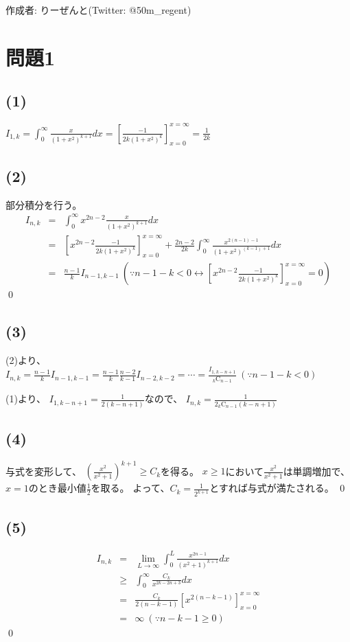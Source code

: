 \documentclass[]{jsarticle}
\begin{document}
作成者: りーぜんと(Twitter: @50m\_regent)
\section*{問題1}
    \subsection*{(1)}
        $
            \displaystyle I_{1, k} = \int^\infty_0\frac{x}{(1+x^2)^{k+1}}dx = \left[\frac{-1}{2k(1+x^2)^k}\right]^{x=\infty}_{x=0} = \frac{1}{2k}
        $
    \subsection*{(2)}
        部分積分を行う。
        \begin{eqnarray}
            I_{n, k} &=& \int^\infty_0x^{2n - 2}\frac{x}{(1 + x^2)^{k + 1}}dx \nonumber \\
            &=& \left[x^{2n - 2}\frac{-1}{2k(1 + x ^ 2)^k}\right]^{x=\infty}_{x=0} + \frac{2n-2}{2k}\int^\infty_0\frac{x^{2(n - 1) - 1}}{(1 + x^2)^{(k - 1) + 1}}dx \nonumber \\
            &=& \frac{n - 1}{k}I_{n - 1, k - 1} \ \left(\because n - 1 - k < 0 \leftrightarrow \left[x^{2n - 2}\frac{-1}{2k(1 + x ^ 2)^k}\right]^{x=\infty}_{x=0} = 0 \right) \nonumber
        \end{eqnarray}
        \qed
    \subsection*{(3)}
        (2)より、
        $\displaystyle I_{n, k} = \frac{n - 1}{k}I_{n - 1, k - 1} = \frac{n - 1}{k}\frac{n - 2}{k - 1}I_{n - 2, k - 2} = \cdots = \frac{I_{1, {k - n + 1}}}{{}_k\mathrm C_{n - 1}} \ (\because n - 1 - k < 0)$

        (1)より、
        $\displaystyle I_{1, {k - n + 1}} = \frac{1}{2(k - n + 1)}$なので、
        $\displaystyle I_{n, k} = \frac{1}{2_k\mathrm C_{n - 1}(k - n + 1)}$
    \subsection*{(4)}
        与式を変形して、
        $\displaystyle\left(\frac{x^2}{x^2 + 1}\right)^{k + 1} \geq C_k$を得る。
        $x\geq 1$において$\displaystyle\frac{x^2}{x^2 + 1}$は単調増加で、
        $x = 1$のとき最小値$\displaystyle\frac{1}{2}$を取る。
        よって、$\displaystyle C_k=\frac{1}{2^{k + 1}}$とすれば与式が満たされる。
        \qed
    \subsection*{(5)}
        \begin{eqnarray}
            I_{n, k} &=& \lim_{L\rightarrow\infty}\int^L_0\frac{x^{2n - 1}}{(x^2 + 1)^{k + 1}}dx \nonumber \\
            &\geq& \int^\infty_0\frac{C_k}{x^{2k - 2n + 3}}dx \nonumber \\
            &=& \frac{C_k}{2(n - k - 1)}\left[x^{2(n - k - 1)}\right]^{x = \infty}_{x = 0} \nonumber \\
            &=& \infty \ (\because n - k - 1 \geq 0) \nonumber
        \end{eqnarray}
        \qed
\end{document}

